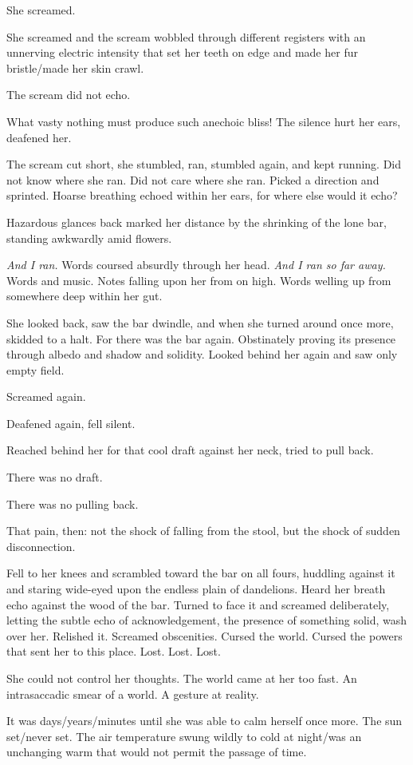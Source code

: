 She screamed.

She screamed and the scream wobbled through different registers with an unnerving electric intensity that set her teeth on edge and made her fur bristle/made her skin crawl.

The scream did not echo.

What vasty nothing must produce such anechoic bliss! The silence hurt her ears, deafened her.

The scream cut short, she stumbled, ran, stumbled again, and kept running. Did not know where she ran. Did not care where she ran. Picked a direction and sprinted. Hoarse breathing echoed within her ears, for where else would it echo?

Hazardous glances back marked her distance by the shrinking of the lone bar, standing awkwardly amid flowers.

\emph{And I ran.} Words coursed absurdly through her head. \emph{And I ran so far away.} Words and music. Notes falling upon her from on high. Words welling up from somewhere deep within her gut.

She looked back, saw the bar dwindle, and when she turned around once more, skidded to a halt. For there was the bar again. Obstinately proving its presence through albedo and shadow and solidity. Looked behind her again and saw only empty field.

Screamed again.

Deafened again, fell silent.

Reached behind her for that cool draft against her neck, tried to pull back.

There was no draft.

There was no pulling back.

That pain, then: not the shock of falling from the stool, but the shock of sudden disconnection.

Fell to her knees and scrambled toward the bar on all fours, huddling against it and staring wide-eyed upon the endless plain of dandelions. Heard her breath echo against the wood of the bar. Turned to face it and screamed deliberately, letting the subtle echo of acknowledgement, the presence of something solid, wash over her. Relished it. Screamed obscenities. Cursed the world. Cursed the powers that sent her to this place. Lost. Lost. Lost.

She could not control her thoughts. The world came at her too fast. An intrasaccadic smear of a world. A gesture at reality.

It was days/years/minutes until she was able to calm herself once more. The sun set/never set. The air temperature swung wildly to cold at night/was an unchanging warm that would not permit the passage of time.

